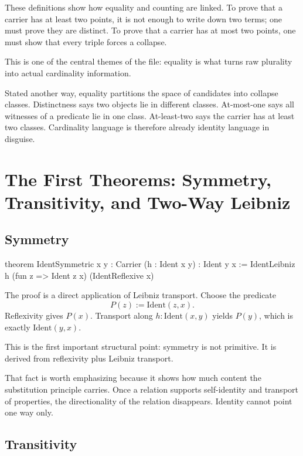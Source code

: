 \documentclass[11pt]{article}
\begin{document}
These definitions show how equality and counting are linked. To prove that a carrier has at least two points, it is not enough to write down two terms; one must prove they are distinct. To prove that a carrier has at most two points, one must show that every triple forces a collapse.

This is one of the central themes of the file: equality is what turns raw plurality into actual cardinality information.

Stated another way, equality partitions the space of candidates into collapse classes. Distinctness says two objects lie in different classes. At-most-one says all witnesses of a predicate lie in one class. At-least-two says the carrier has at least two classes. Cardinality language is therefore already identity language in disguise.

\section{The First Theorems: Symmetry, Transitivity, and Two-Way Leibniz}

\subsection{Symmetry}

\begin{leanblock}
theorem IdentSymmetric {x y : Carrier} (h : Ident x y) : Ident y x :=
  IdentLeibniz h (fun z => Ident z x) (IdentReflexive x)
\end{leanblock}

The proof is a direct application of Leibniz transport. Choose the predicate
\[
P(z) := \mathrm{Ident}(z,x).
\]
Reflexivity gives \(P(x)\). Transport along \(h : \mathrm{Ident}(x,y)\) yields \(P(y)\), which is exactly \(\mathrm{Ident}(y,x)\).

This is the first important structural point: symmetry is not primitive. It is derived from reflexivity plus Leibniz transport.

That fact is worth emphasizing because it shows how much content the substitution principle carries. Once a relation supports self-identity and transport of properties, the directionality of the relation disappears. Identity cannot point one way only.

\subsection{Transitivity}
\end{document}
